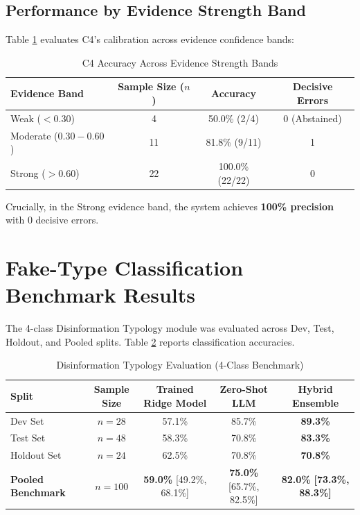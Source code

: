 \documentclass[12pt,a4paper]{report}
\begin{document}
\subsection{Performance by Evidence Strength Band}
Table \ref{tab:evidence_bands} evaluates C4's calibration across evidence confidence bands:
\begin{table}[h!]
\centering
\caption{C4 Accuracy Across Evidence Strength Bands}
\label{tab:evidence_bands}
\begin{tabular}{|l|c|c|c|}
\hline
\textbf{Evidence Band} & \textbf{Sample Size ($n$)} & \textbf{Accuracy} & \textbf{Decisive Errors} \\
\hline
Weak ($< 0.30$) & 4 & 50.0\% (2/4) & 0 (Abstained) \\
Moderate ($0.30 - 0.60$) & 11 & 81.8\% (9/11) & 1 \\
Strong ($> 0.60$) & 22 & 100.0\% (22/22) & 0 \\
\hline
\end{tabular}
\end{table}
Crucially, in the Strong evidence band, the system achieves \textbf{100\% precision} with 0 decisive errors.

\section{Fake-Type Classification Benchmark Results}
The 4-class Disinformation Typology module was evaluated across Dev, Test, Holdout, and Pooled splits. Table \ref{tab:fake_type_results} reports classification accuracies.

\begin{table}[h!]
\centering
\caption{Disinformation Typology Evaluation (4-Class Benchmark)}
\label{tab:fake_type_results}
\begin{tabular}{|l|c|c|c|c|}
\hline
\textbf{Split} & \textbf{Sample Size} & \textbf{Trained Ridge Model} & \textbf{Zero-Shot LLM} & \textbf{Hybrid Ensemble} \\
\hline
Dev Set & $n = 28$ & 57.1\% & 85.7\% & \textbf{89.3\%} \\
Test Set & $n = 48$ & 58.3\% & 70.8\% & \textbf{83.3\%} \\
Holdout Set & $n = 24$ & 62.5\% & 70.8\% & \textbf{70.8\%} \\
\hline
\textbf{Pooled Benchmark} & \textbf{$n = 100$} & \textbf{59.0\%} [49.2\%, 68.1\%] & \textbf{75.0\%} [65.7\%, 82.5\%] & \textbf{82.0\%} \textbf{[73.3\%, 88.3\%]} \\
\hline
\end{tabular}
\end{table}
\end{document}
